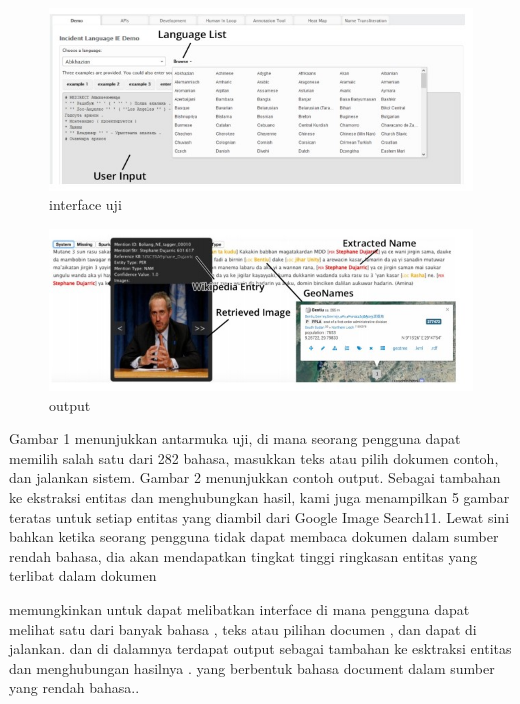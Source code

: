 \documentclass[12pt]{article}
\begin{document}
\begin{figure}[ht]
\centerline{\includegraphics[width=1\textwidth]{satu.JPG}}
\caption{interface uji}
\label{gambarPFS2}
\end{figure}

\begin{figure}[ht]
\centerline{\includegraphics[width=1\textwidth]{dua.JPG}}
\caption{output}
\label{gambarPFS3}
\end{figure}

Gambar 1 menunjukkan antarmuka uji, di mana seorang pengguna dapat memilih salah satu dari 282 bahasa, masukkan teks atau pilih dokumen contoh, dan jalankan sistem. Gambar 2 menunjukkan contoh output. Sebagai tambahan ke ekstraksi entitas dan menghubungkan hasil, kami juga menampilkan 5 gambar teratas untuk setiap entitas yang diambil dari Google Image Search11. Lewat sini bahkan ketika seorang pengguna tidak dapat membaca dokumen dalam sumber rendah bahasa, dia akan mendapatkan tingkat tinggi ringkasan entitas yang terlibat dalam dokumen

memungkinkan untuk dapat melibatkan interface di mana pengguna dapat melihat satu dari banyak bahasa , teks atau pilihan documen , dan dapat di jalankan. dan di dalamnya terdapat output sebagai tambahan ke esktraksi entitas dan menghubungan hasilnya . yang berbentuk bahasa document dalam sumber yang rendah bahasa.\cite{zhangelisa}.
\end{document}
